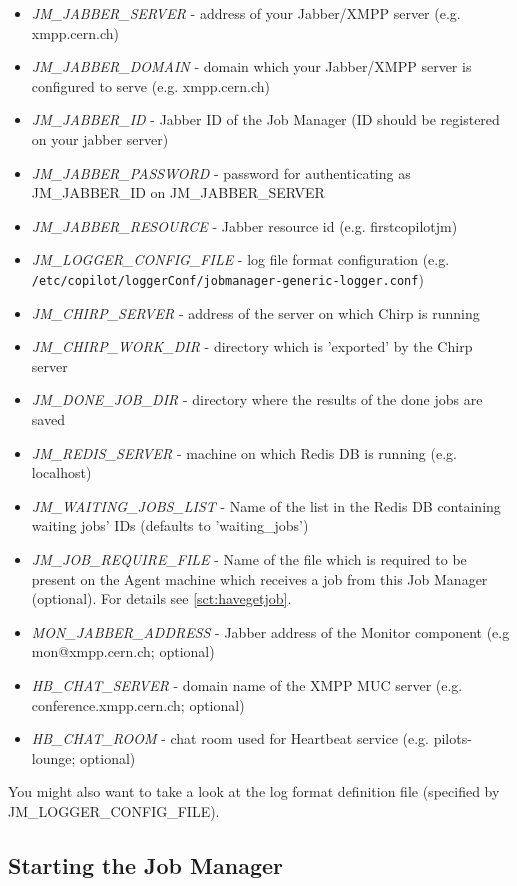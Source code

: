 \begin{itemize}
  \item \emph{JM\_JABBER\_SERVER} - address of your Jabber/XMPP server (e.g. xmpp.cern.ch)
  \item \emph{JM\_JABBER\_DOMAIN} - domain which your Jabber/XMPP server is configured to serve (e.g. xmpp.cern.ch)
  \item \emph{JM\_JABBER\_ID} - Jabber ID of the Job Manager (ID should be registered on your jabber server)
  \item \emph{JM\_JABBER\_PASSWORD} - password for authenticating as JM\_JABBER\_ID on JM\_JABBER\_SERVER
  \item \emph{JM\_JABBER\_RESOURCE} - Jabber resource id (e.g. firstcopilotjm)
  \item \emph{JM\_LOGGER\_CONFIG\_FILE} - log file format configuration (e.g. \texttt{/etc/copilot/loggerConf/jobmanager-generic-logger.conf})
  \item \emph{JM\_CHIRP\_SERVER} - address of the server on which Chirp is running
  \item \emph{JM\_CHIRP\_WORK\_DIR} - directory which is 'exported' by the Chirp server
  \item \emph{JM\_DONE\_JOB\_DIR} - directory where the results of the done jobs are saved
  \item \emph{JM\_REDIS\_SERVER} - machine on which Redis DB is running (e.g. localhost)
  \item \emph{JM\_WAITING\_JOBS\_LIST} - Name of the list in the Redis DB containing waiting jobs' IDs (defaults to 'waiting\_jobs')
  \item \emph{JM\_JOB\_REQUIRE\_FILE} - Name of the file which is required to be present on the Agent machine which receives a job from this Job Manager (optional). For details see \ref{sct:havegetjob}.
  \item \emph{MON\_JABBER\_ADDRESS} - Jabber address of the Monitor component (e.g mon@xmpp.cern.ch; optional)
  \item \emph{HB\_CHAT\_SERVER} - domain name of the XMPP MUC server (e.g. conference.xmpp.cern.ch; optional)
  \item \emph{HB\_CHAT\_ROOM} - chat room used for Heartbeat service (e.g. pilots-lounge; optional)
 \end{itemize}

You might also want to take a look at the log format definition file (specified by JM\_LOGGER\_CONFIG\_FILE).

\subsection{Starting the Job Manager}

